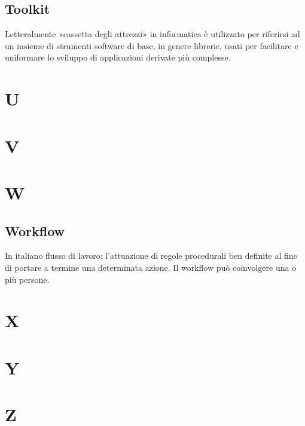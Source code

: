 
\subsection*{Toolkit}
Letteralmente «cassetta degli attrezzi» in informatica è utilizzato per riferirsi ad un insieme di strumenti software di base, in genere librerie, usati per facilitare e uniformare lo sviluppo di applicazioni derivate più complesse. 

\clearpage
\section*{U}

\clearpage
\section*{V}


\clearpage
\section*{W}

\subsection*{Workflow}
In italiano flusso di lavoro; l'attuazione di regole procedurali ben definite al fine di portare a termine una determinata azione. Il workflow può coinvolgere una o più persone.


\clearpage
\section*{X}

\clearpage
\section*{Y}

\clearpage
\section*{Z}
